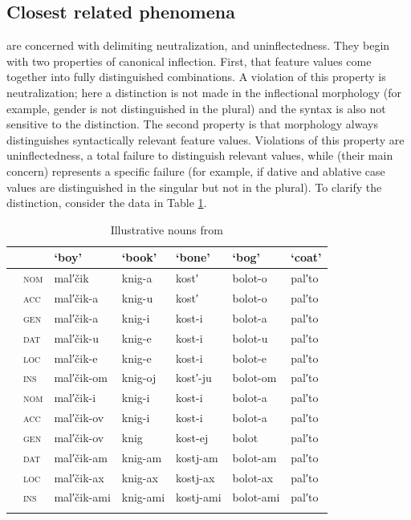 \documentclass[output=paper,colorlinks,citecolor=brown]{langscibook}
\begin{document}
\subsection{Closest related phenomena} \label{01sec2.3}

\citet[27--35]{baermanbrowncorbett2005} are concerned with delimiting neutralization,  and uninflectedness. They begin with two properties of canonical inflection. First, that feature values come together into fully distinguished combinations. A violation of this property is neutralization; here a distinction is not made in the inflectional morphology (for example, gender is not distinguished in the plural) and the syntax is also not sensitive to the distinction. The second property is that morphology always distinguishes syntactically relevant feature values. Violations of this property are uninflectedness, a total failure to distinguish relevant values, while  (their main concern) represents a specific failure (for example, if dative and ablative case values are distinguished in the singular but not in the plural). To clarify the distinction, consider the data in Table \ref{01tab2}.

\begin{table}[ht]
	\centering
	\caption{Illustrative nouns from \protect\footnotemark}
	\label{01tab2}
	\begin{tabularx}{\textwidth}{llp{2cm}XXXX}
		\lsptoprule
		&  & ‘boy’ & ‘book’ & ‘bone’ & ‘bog’ & ‘coat’ \\
		\midrule
		\multirow{6}{*}{\rotatebox{90}{\textsc{singular}}}
		& \textsc{nom} & mal′čik     & knig-a    & kost′     & bolot-o    & pal′to \\
		& \textsc{acc} & mal′čik-a   & knig-u    & kost′     & bolot-o    & pal′to \\
		& \textsc{gen} & mal′čik-a   & knig-i    & kost-i    & bolot-a    & pal′to \\
		& \textsc{dat} & mal′čik-u   & knig-e    & kost-i    & bolot-u    & pal′to \\
		& \textsc{loc} & mal′čik-e   & knig-e    & kost-i    & bolot-e    & pal′to \\
		& \textsc{ins} & mal′čik-om  & knig-oj   & kost′-ju  & bolot-om   & pal′to \\
		\midrule
		\multirow{6}{*}{\rotatebox{90}{\textsc{plural}}}
		& \textsc{nom} & mal′čik-i   & knig-i    & kost-i    & bolot-a    & pal′to \\
		& \textsc{acc} & mal′čik-ov  & knig-i    & kost-i    & bolot-a    & pal′to \\
		& \textsc{gen} & mal′čik-ov  & knig      & kost-ej   & bolot      & pal′to \\
		& \textsc{dat} & mal′čik-am  & knig-am   & kostj-am  & bolot-am   & pal′to \\
		& \textsc{loc} & mal′čik-ax  & knig-ax   & kostj-ax  & bolot-ax   & pal′to \\
		& \textsc{ins} & mal′čik-ami & knig-ami  & kostj-ami & bolot-ami  & pal′to \\
		\lspbottomrule
	\end{tabularx}
\end{table}
\end{document}
